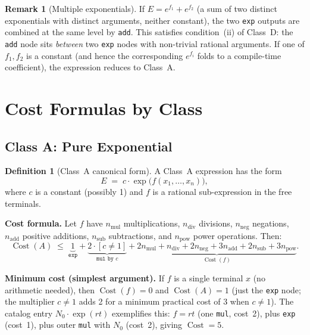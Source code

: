 \documentclass[12pt,a4paper]{article}
\theoremstyle{definition}
\newtheorem{definition}[theorem]{Definition}
\newtheorem{remark}[theorem]{Remark}
\newcommand{\Cost}{\operatorname{Cost}}
\begin{document}
\begin{remark}[Multiple exponentials]
If $E = e^{f_1} + e^{f_2}$ (a sum of two distinct exponentials with distinct
arguments, neither constant), the two \texttt{exp} outputs are combined at
the same level by \texttt{add}.
This satisfies condition~(ii) of Class~D: the \texttt{add} node sits
\emph{between} two \texttt{exp} nodes with non-trivial rational arguments.
If one of $f_1, f_2$ is a constant (and hence the corresponding $e^{f_i}$
folds to a compile-time coefficient), the expression reduces to Class~A.
\end{remark}

\section{Cost Formulas by Class}
\label{sec:formulas}

\subsection{Class A: Pure Exponential}
\label{subsec:classA}

\begin{definition}[Class~A canonical form]
\label{def:classA}
A Class~A expression has the form
\[
  E \;=\; c \cdot \exp\!\bigl(f(x_1, \ldots, x_n)\bigr),
\]
where $c$ is a constant (possibly 1) and $f$ is a rational sub-expression
in the free terminals.
\end{definition}

\noindent\textbf{Cost formula.}
Let $f$ have $n_{\mathrm{mul}}$ multiplications, $n_{\mathrm{div}}$ divisions,
$n_{\mathrm{neg}}$ negations, $n_{\mathrm{add}}$ positive additions,
$n_{\mathrm{sub}}$ subtractions, and $n_{\mathrm{pow}}$ power operations.
Then:
\begin{equation}
\label{eq:costA}
  \Cost(A) \;\leq\; \underbrace{1}_{\texttt{exp}}
                + \underbrace{2 \cdot [c \neq 1]}_{\texttt{mul by }c}
                + \underbrace{
                    2 n_{\mathrm{mul}} + n_{\mathrm{div}} + 2 n_{\mathrm{neg}}
                    + 3 n_{\mathrm{add}} + 2 n_{\mathrm{sub}} + 3 n_{\mathrm{pow}}
                  }_{\Cost(f)}.
\end{equation}

\noindent\textbf{Minimum cost (simplest argument).}
If $f$ is a single terminal $x$ (no arithmetic needed), then
$\Cost(f) = 0$ and $\Cost(A) = 1$ (just the \texttt{exp} node; the
multiplier $c \neq 1$ adds 2 for a minimum practical cost of 3 when
$c \neq 1$).
The catalog entry $N_0 \cdot \exp(rt)$ exemplifies this: $f = rt$
(one \texttt{mul}, cost~2), plus \texttt{exp} (cost~1), plus outer
\texttt{mul} with $N_0$ (cost~2), giving $\Cost = 5$.
\end{document}
